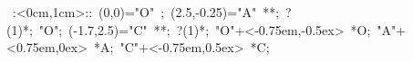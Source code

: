 
\hbox{
\xy    <1cm,0cm>:<0cm,1cm>::
       (0,0)="O" ; (2.5,-0.25)="A" **\dir{-};  ?(1)*\dir{>};
       "O"; (-1.7,2.5)="C" **\dir{-};  ?(1)*\dir{>};
       "O"+<-0.75em,-0.5ex> *{O};
       "A"+<0.75em,0ex> *{A};
       "C"+<-0.75em,0.5ex> *{C};
       \endxy}
	   
